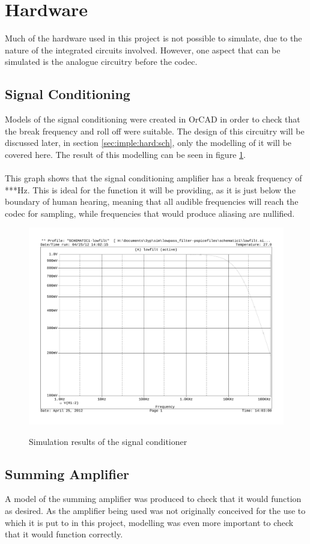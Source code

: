 \section{Hardware}
Much of the hardware used in this project is not possible to simulate, due to
the nature of the integrated circuits involved.
However, one aspect that can be simulated is the analogue circuitry before the
codec.

\subsection{Signal Conditioning}
Models of the signal conditioning were created in OrCAD in order to check that
the break frequency and roll off were suitable.
The design of this circuitry will be discussed later, in section
\ref{sec:imple:hard:sch}, only the modelling of it will be covered here.
The result of this modelling can be seen in figure \ref{fig:sigcondmodel}.
\\
\\
This graph shows that the signal conditioning amplifier has a break frequency
of ***Hz.
This is ideal for the function it will be providing, as it is just below the
boundary of human hearing, meaning that all audible frequencies will reach 
the codec for sampling, while frequencies that would produce aliasing are
nullified.

\begin{figure}[H]
	\centering
	\includegraphics[width=\textwidth]{./img/signal_conditioning_sim.pdf}
	\label{fig:sigcondmodel}
	\caption{Simulation results of the signal conditioner}
\end{figure}

\subsection{Summing Amplifier}
A model of the summing amplifier was produced to check that it would function
as desired.
As the amplifier being used was not originally conceived for the use to which
it is put to in this project, modelling was even more important to check that
it would function correctly.
